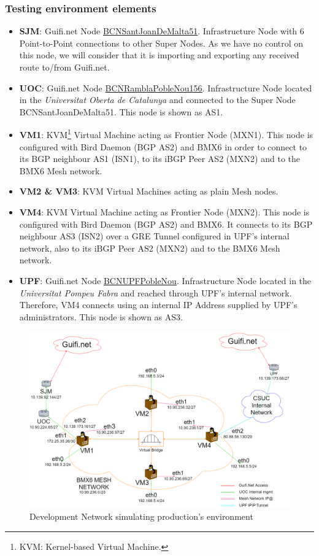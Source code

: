 \subsubsection{Testing environment elements}
\begin{itemize}
    \item \textbf{SJM}: Guifi.net Node  \href{https://guifi.net/en/node/20262/}{BCNSantJoanDeMalta51}. Infrastructure Node with 6 Point-to-Point connections to other Super Nodes. As we have no control on this node, we will consider that it is importing and exporting any received route to/from Guifi.net.
    \item \textbf{UOC}: Guifi.net Node \href{https://guifi.net/en/node/63255}{BCNRamblaPobleNou156}. Infrastructure Node located in the \textit{Universitat Oberta de Catalunya} and connected to the Super Node BCNSantJoanDeMalta51. This node is shown as AS1.
    \item \textbf{VM1}: KVM\footnote{KVM: Kernel-based Virtual Machine.} Virtual Machine acting as Frontier Node (MXN1). This node is configured with Bird Daemon (BGP AS2) and BMX6 in order to connect to its BGP neighbour AS1 (ISN1), to its iBGP Peer AS2 (MXN2) and to the BMX6 Mesh network.
    \item \textbf{VM2 \& VM3}: KVM Virtual Machines acting as plain Mesh nodes.
    \item \textbf{VM4}: KVM Virtual Machine acting as Frontier Node (MXN2). This node is configured with Bird Daemon (BGP AS2) and BMX6. It connects to its BGP neighbour AS3 (ISN2) over a GRE Tunnel configured in UPF's internal network, also to its iBGP Peer AS2 (MXN2) and to the BMX6 Mesh network.
    \item \textbf{UPF}: Guifi.net Node \href{https://guifi.net/en/node/56604}{BCNUPFPobleNou}. Infrastructure Node located in the \textit{Universitat Pompeu Fabra} and reached through UPF's internal network. Therefore, VM4 connects using an internal IP Address supplied by UPF's administrators. This node is shown as AS3.
\end{itemize}


\begin{landscape}
\begin{figure}[ht!]
    \centering
    \includegraphics[width=\hsize]{images/devnetfull}
    \caption{Development Network simulating production's environment}
    \label{fig:devnet}
\end{figure}
\end{landscape}
\newpage

